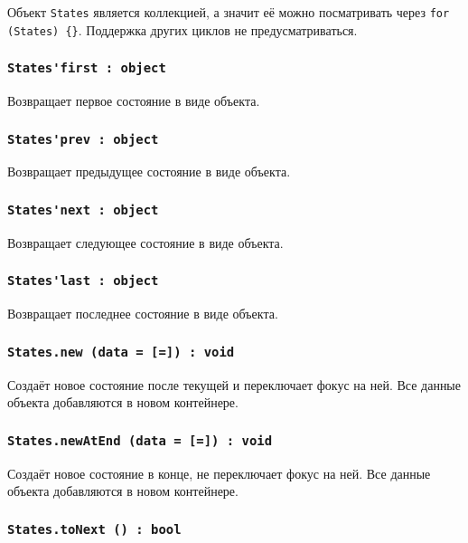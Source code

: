 Объект \lstinline|States| является коллекцией, а значит её можно посматривать через \lstinline|for (States) {}|. Поддержка других циклов не предусматриваться.

\subsubsection{\lstinline|States'first : object|}

Возвращает первое состояние в виде объекта.

\subsubsection{\lstinline|States'prev : object|}

Возвращает предыдущее состояние в виде объекта.

\subsubsection{\lstinline|States'next : object|}

Возвращает следующее состояние в виде объекта.

\subsubsection{\lstinline|States'last : object|}

Возвращает последнее состояние в виде объекта.

\subsubsection{\lstinline|States.new (data = [=]) : void|}

Создаёт новое состояние после текущей и переключает фокус на ней. Все данные объекта  добавляются в новом контейнере.

\subsubsection{\lstinline|States.newAtEnd (data = [=]) : void|}

Создаёт новое состояние в конце, не переключает фокус на ней. Все данные объекта  добавляются в новом контейнере.

\subsubsection{\lstinline|States.toNext () : bool|}

